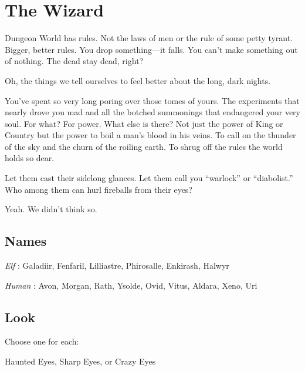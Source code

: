 \chapter{The Wizard}
  
 





Dungeon World has rules. Not the laws of men or the rule of some petty tyrant. Bigger, better rules. You drop something—it falls. You can’t make something out of nothing. The dead stay dead, right?

 

Oh, the things we tell ourselves to feel better about the long, dark nights.

 

You’ve spent so very long poring over those tomes of yours. The experiments that nearly drove you mad and all the botched summonings that endangered your very soul. For what? For power. What else is there? Not just the power of King or Country but the power to boil a man's blood in his veins. To call on the thunder of the sky and the churn of the roiling earth. To shrug off the rules the world holds so dear.

 

Let them cast their sidelong glances. Let them call you “warlock” or “diabolist.” Who among them can hurl fireballs from their eyes?

 

Yeah. We didn’t think so.



 
\section{Names}   
 



{\em Elf} : Galadiir, Fenfaril, Lilliastre, Phirosalle, Enkirash, Halwyr

  

{\em Human} : Avon, Morgan, Rath, Ysolde, Ovid, Vitus, Aldara, Xeno, Uri



 
\section{Look}  
 



Choose one for each:

 

Haunted Eyes, Sharp Eyes, or Crazy Eyes

